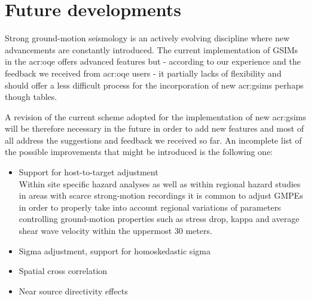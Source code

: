%
\section{Future developments}
%
Strong ground-motion seismology is an actively evolving discipline where
new advancements are constantly introduced.  
%
The current implementation of GSIMs in the \gls{acr:oqe} offers advanced
features but - according to our experience and the feedback we received
from \gls{acr:oqe} users - it partially lacks of flexibility and should offer
a less difficult process for the incorporation of new \glspl{acr:gsim} perhaps
though tables. 

A revision of the current scheme adopted for the implementation of new 
\glspl{acr:gsim} will be therefore necessary in the future in order to add
new features and most of all address the suggestions and feedback we received so
far. 
%
An incomplete list of the possible improvements that might be introduced 
is the following one:
%
\begin{itemize}
\item Support for host-to-target adjustment \hfill \\
    Within site specific hazard analyses \citep[see for example][]{bommer2014}
    as well as within regional hazard studies in areas with scarce strong-motion
    recordings it is common to adjust GMPEs in order to properly take into
    account regional variations of parameters controlling ground-motion
    properties such as stress drop, kappa and average shear wave velocity within
    the uppermost 30 meters.
\item Sigma adjustment, support for homoskedastic sigma \hfill \\ 

\item Spatial cross correlation \hfill \\
    
\item Near source directivity effects \hfill \\

\end{itemize}
